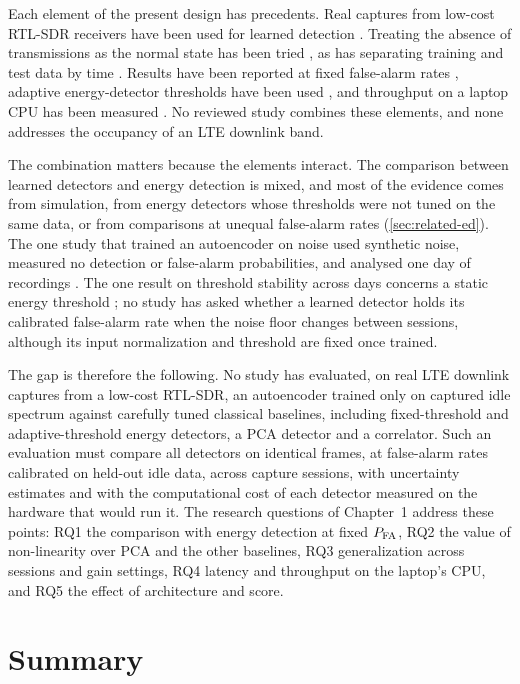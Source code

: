 Each element of the present design has precedents. Real captures from low-cost RTL-SDR receivers have been used for learned detection \parencite{rajendran2020,saber2021,baset2023}. Treating the absence of transmissions as the normal state has been tried \parencite{torio2025}, as has separating training and test data by time \parencite{rajendran2020}. Results have been reported at fixed false-alarm rates \parencite{zheng2020,grosu2021}, adaptive energy-detector thresholds have been used \parencite{grosu2021,baset2023}, and throughput on a laptop CPU has been measured \parencite{baset2023}. No reviewed study combines these elements, and none addresses the occupancy of an LTE downlink band.

The combination matters because the elements interact. The comparison between learned detectors and energy detection is mixed, and most of the evidence comes from simulation, from energy detectors whose thresholds were not tuned on the same data, or from comparisons at unequal false-alarm rates (\cref{sec:related-ed}). The one study that trained an autoencoder on noise used synthetic noise, measured no detection or false-alarm probabilities, and analysed one day of recordings \parencite{torio2025}. The one result on threshold stability across days concerns a static energy threshold \parencite{baset2023}; no study has asked whether a learned detector holds its calibrated false-alarm rate when the noise floor changes between sessions, although its input normalization and threshold are fixed once trained.

The gap is therefore the following. No study has evaluated, on real LTE downlink captures from a low-cost RTL-SDR, an autoencoder trained only on captured idle spectrum against carefully tuned classical baselines, including fixed-threshold and adaptive-threshold energy detectors, a PCA detector and a \syncsignal{} correlator. Such an evaluation must compare all detectors on identical frames, at false-alarm rates calibrated on held-out idle data, across capture sessions, with uncertainty estimates and with the computational cost of each detector measured on the hardware that would run it. The research questions of Chapter~1 address these points: RQ1 the comparison with energy detection at fixed $P_{\mathrm{FA}}$, RQ2 the value of non-linearity over PCA and the other baselines, RQ3 generalization across sessions and gain settings, RQ4 latency and throughput on the laptop's CPU, and RQ5 the effect of architecture and score.

\section{Summary}
\label{sec:lit-summary}

